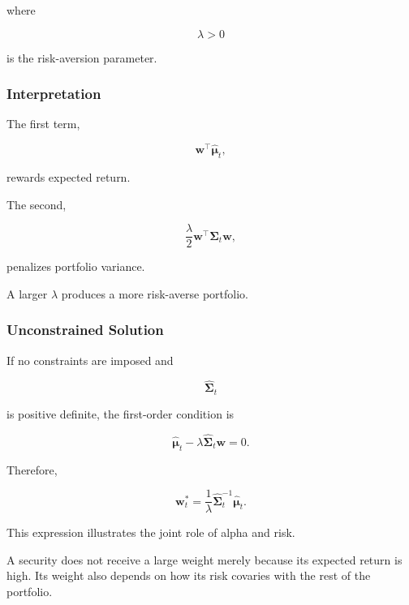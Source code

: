 \documentclass[11pt,a4paper]{article}
\begin{document}
where

\begin{equation}
\lambda>0
\end{equation}

is the risk-aversion parameter.


\subsubsection{Interpretation}

The first term,

\begin{equation}
\mathbf{w}^{\top}
\widehat{\boldsymbol{\mu}}_t,
\end{equation}

rewards expected return.

The second,

\begin{equation}
\frac{\lambda}{2}
\mathbf{w}^{\top}
\widehat{\boldsymbol{\Sigma}}_t
\mathbf{w},
\end{equation}

penalizes portfolio variance.

A larger $\lambda$ produces a more risk-averse portfolio.


\subsubsection{Unconstrained Solution}

If no constraints are imposed and

\begin{equation}
\widehat{\boldsymbol{\Sigma}}_t
\end{equation}

is positive definite, the first-order condition is

\begin{equation}
\widehat{\boldsymbol{\mu}}_t
-
\lambda
\widehat{\boldsymbol{\Sigma}}_t
\mathbf{w}
=
0.
\end{equation}

Therefore,

\begin{equation}
\boxed{
\mathbf{w}_t^{*}
=
\frac{1}{\lambda}
\widehat{\boldsymbol{\Sigma}}_t^{-1}
\widehat{\boldsymbol{\mu}}_t.
}
\end{equation}

This expression illustrates the joint role of alpha and risk.

A security does not receive a large weight merely because its expected return
is high. Its weight also depends on how its risk covaries with the rest of the
portfolio.
\end{document}
